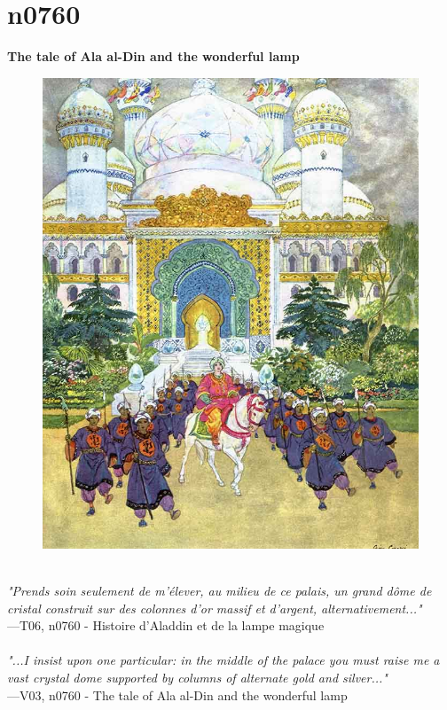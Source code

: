 \documentclass[../Carre_nights.tex]{subfiles}
\begin{document}
\newpage

\section{n0760}
\textbf{\Large{The tale of Ala al-Din and the wonderful lamp}} \\

\begin{figure}[ht]
\centering
\includegraphics[height=\figsize]{illustrations/volume_6/T06, n0760 - Histoire d'Aladdin et de la lampe magique.jpg}
\end{figure}

\textit{\\
"Prends soin seulement de m’élever, au milieu de ce palais, un grand dôme de cristal construit sur des colonnes d’or massif et d’argent, alternativement..."} \\
—T06, n0760 - Histoire d'Aladdin et de la lampe magique \\~\\
\textit{"...I insist upon one particular: in the middle of the palace you must raise me a vast crystal dome supported by columns of alternate gold and silver..."} \\
—V03, n0760 - The tale of Ala al-Din and the wonderful lamp
\end{document}
